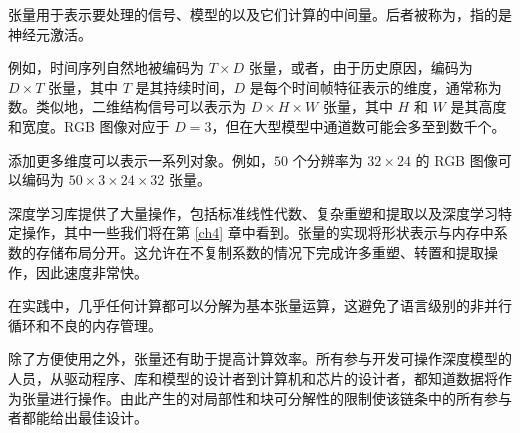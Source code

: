 张量用于表示要处理的信号、模型的以及它们计算的中间量。后者被称为，指的是神经元激活。

例如，时间序列自然地被编码为 $T \times D$ 张量，或者，由于历史原因，编码为 $D \times T$ 张量，其中 $T$ 是其持续时间，$D$ 是每个时间帧特征表示的维度，通常称为数。类似地，二维结构信号可以表示为 $D \times H \times W$ 张量，其中 $H$ 和 $W$ 是其高度和宽度。RGB 图像对应于 $D = 3$，但在大型模型中通道数可能会多至到数千个。

添加更多维度可以表示一系列对象。例如，$50$ 个分辨率为 $32 \times 24$ 的 RGB 图像可以编码为 $50 \times 3 \times 24 \times 32$ 张量。

深度学习库提供了大量操作，包括标准线性代数、复杂重塑和提取以及深度学习特定操作，其中一些我们将在第 \ref{ch4} 章中看到。张量的实现将形状表示与内存中系数的存储布局分开。这允许在不复制系数的情况下完成许多重塑、转置和提取操作，因此速度非常快。

在实践中，几乎任何计算都可以分解为基本张量运算，这避免了语言级别的非并行循环和不良的内存管理。

除了方便使用之外，张量还有助于提高计算效率。所有参与开发可操作深度模型的人员，从驱动程序、库和模型的设计者到计算机和芯片的设计者，都知道数据将作为张量进行操作。由此产生的对局部性和块可分解性的限制使该链条中的所有参与者都能给出最佳设计。